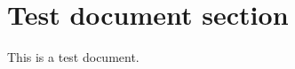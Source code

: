 \documentclass{article}
\begin{document}
\section{Test document section}
This is a test document.
\end{document}
